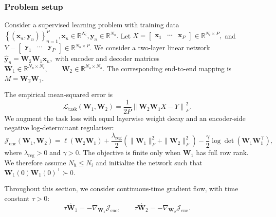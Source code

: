 \documentclass{article} %
\newcommand{\wa}{\mathbf{W}_1}
\newcommand{\wb}{\mathbf{W}_2}
\theoremstyle{remark}
\begin{document}
\subsubsection{Problem setup}

Consider a supervised learning problem with training data
$
\left\{
    \left(\mathbf{x}_n,\mathbf{y}_n\right)
\right\}_{n=1}^{P},
\mathbf{x}_n\in\mathbb{R}^{N_i},
\mathbf{y}_n\in\mathbb{R}^{N_o}.
$
Let
$
X=
\begin{bmatrix}
\mathbf{x}_1 & \cdots & \mathbf{x}_P
\end{bmatrix}
\in\mathbb{R}^{N_i\times P},$ and $
Y=
\begin{bmatrix}
\mathbf{y}_1 & \cdots & \mathbf{y}_P
\end{bmatrix}
\in\mathbb{R}^{N_o\times P}.
$
We consider a two-layer linear network
$ \widehat{\mathbf{y}}_n = \wb\wa\mathbf{x}_n,
$
with encoder and decoder matrices
$
\wa\in\mathbb{R}^{N_h\times N_i},
\qquad
\wb\in\mathbb{R}^{N_o\times N_h}.
$
The corresponding end-to-end mapping is
$
M=\wb\wa.
$

The empirical mean-squared error is
\begin{equation}
\mathcal{L}_{\mathrm{task}}(\wa,\wb)
=
\frac{1}{2P}
\left\|
    \wb\wa X-Y
\right\|_F^2.
\label{eq:task-loss}
\end{equation}
We augment the task loss with equal layerwise weight decay and an
encoder-side negative log-determinant regulariser:
\begin{equation}
\mathcal{J}_{\mathrm{enc}}(\wa,\wb)
=
\ell(\wb\wa)
+
\frac{\lambda_{\mathrm{reg}}}{2}
\left(
    \|\wa\|_F^2+\|\wb\|_F^2
\right)
-
\frac{\gamma}{2}
\log\det\left(\wa\wa^\top\right),
\label{eq:encoder-regularised-objective}
\end{equation}
where
$
\lambda_{\mathrm{reg}}>0 $ and $
\gamma>0.
$
The objective is finite only when \(\wa\) has full row rank. We
therefore assume \(N_h\leq N_i\) and initialize the network such that
$
\wa(0)\wa(0)^\top\succ0.
$

Throughout this section, we consider continuous-time gradient flow,
with time constant \(\tau>0\):
\begin{equation}
\tau\dot{\wa}
=
-\nabla_{\wa}\mathcal{J}_{\mathrm{enc}},
\qquad
\tau\dot{\wb}
=
-\nabla_{\wb}\mathcal{J}_{\mathrm{enc}}.
\label{eq:gradient-flow-definition}
\end{equation}
\end{document}
